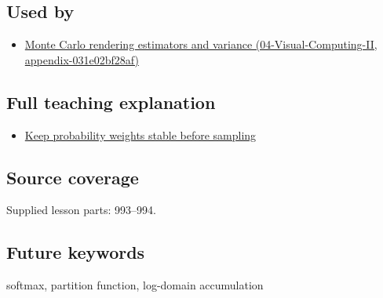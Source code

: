 \subsection{Used by}\label{appendix-d580b422240f-used-by}

\begin{itemize}
\tightlist
\item
  \href{../04-Visual-Computing-II/main.pdf\#nameddest=appendix-031e02bf28af}{Monte Carlo rendering estimators and variance (04-Visual-Computing-II, appendix-031e02bf28af)}
\end{itemize}

\subsection{Full teaching explanation}\label{appendix-d580b422240f-full-teaching-explanation}

\begin{itemize}
\tightlist
\item
  \hyperref[02-foundations-ii-ch031-keep-probability-weights-stable-before-sampling]{Keep probability weights stable before sampling}
\end{itemize}

\subsection{Source coverage}\label{appendix-d580b422240f-source-coverage}

Supplied lesson parts: 993--994.

\subsection{Future keywords}\label{appendix-d580b422240f-future-keywords}

softmax, partition function, log-domain accumulation
